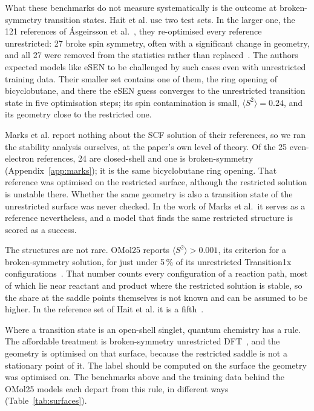 What these benchmarks do not measure systematically is the outcome at
broken-symmetry transition states. Hait et al. use two test sets. In
the larger one, the 121 references of \'Asgeirsson et
al.~\cite{asgeirsson2021}, they re-optimised every reference
unrestricted: 27 broke spin symmetry, often with a significant change
in geometry, and all 27 were removed from the statistics rather than
replaced~\cite{hait2025}. The authors expected models like eSEN to be
challenged by such cases even with unrestricted training data. Their
smaller set contains one of them, the ring opening of bicyclobutane,
and there the eSEN guess converges to the unrestricted transition state
in five optimisation steps; its spin contamination is small,
$\langle S^2\rangle = 0.24$, and its geometry close to the restricted
one.

Marks et al. report nothing about the SCF solution of their references,
so we ran the stability analysis ourselves, at the paper's own level of
theory. Of the 25 even-electron references, 24 are closed-shell and one
is broken-symmetry (Appendix~\ref{app:marks}); it is the same
bicyclobutane ring opening. That reference was optimised on the
restricted surface, although the restricted solution is unstable there.
Whether the same geometry is also a transition state of the
unrestricted surface was never checked. In the work of Marks et al.\ it
serves as a reference nevertheless, and a model that finds the same
restricted structure is scored as a success.

The structures are not rare. OMol25 reports $\langle S^2 \rangle >
0.001$, its criterion for a broken-symmetry solution, for just under 5\,\% of
its unrestricted Transition1x configurations~\cite{omol25}. That number counts every configuration of
a reaction path, most of which lie near reactant and product where the
restricted solution is stable, so the share at the saddle points
themselves is not known and can be assumed to be higher. In the
reference set of Hait et al. it is a fifth~\cite{hait2025}.

Where a transition state is an open-shell singlet, quantum chemistry
has a rule. The affordable treatment is broken-symmetry unrestricted
DFT~\cite{grafenstein2002, crawford2001}, and the geometry is optimised
on that surface, because the restricted saddle is not a stationary
point of it. The label should be computed on the surface the
geometry was optimised on. The
benchmarks above and the training data behind the OMol25 models each
depart from this rule, in different ways (Table~\ref{tab:surfaces}).


